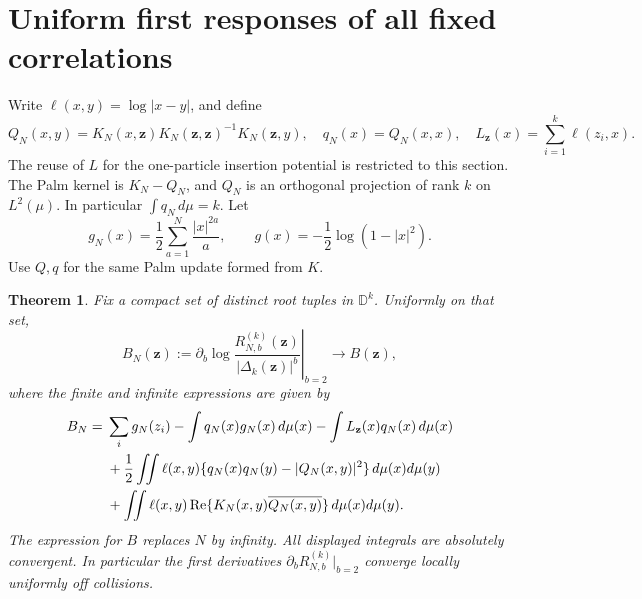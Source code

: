 \documentclass[11pt]{article}
\newtheorem{theorem}{Theorem}[section]
\theoremstyle{remark}\newtheorem{remark}[theorem]{Remark}
\newcommand{\D}{\mathbb D}
\newcommand{\Rea}{\operatorname{Re}}
\begin{document}
\section{Uniform first responses of all fixed correlations}
Write $\ell(x,y)=\log|x-y|$, and define
\[
 Q_N(x,y)=K_N(x,\mathbf z)K_N(\mathbf z,\mathbf z)^{-1}K_N(\mathbf z,y),
 \quad q_N(x)=Q_N(x,x),\quad
 L_{\mathbf z}(x)=\sum_{i=1}^k\ell(z_i,x).
\]
The reuse of $L$ for the one-particle insertion potential is restricted to
this section. The Palm kernel is $K_N-Q_N$, and $Q_N$ is an orthogonal
projection of rank $k$ on $L^2(\mu)$. In particular $\int q_N\,d\mu=k$.
Let
\[
 g_N(x)=\frac12\sum_{a=1}^N\frac{|x|^{2a}}a,
 \qquad g(x)=-\frac12\log(1-|x|^2).
\]
Use $Q,q$ for the same Palm update formed from $K$.

\begin{theorem}\label{first}
Fix a compact set of distinct root tuples in $\D^k$. Uniformly on that set,
\[
 B_N(\mathbf z):=
 \left.\partial_b\log\frac{R_{N,b}^{(k)}(\mathbf z)}
 {|\Delta_k(\mathbf z)|^b}\right|_{b=2}
 \longrightarrow B(\mathbf z),
\]
where the finite and infinite expressions are given by
\begin{align}\label{Bformula}
 B_N={}&\sum_i g_N(z_i)-\int q_N(x)g_N(x)\,d\mu(x)
          -\int L_{\mathbf z}(x)q_N(x)\,d\mu(x)\notag\\
 &+\frac12\iint\ell(x,y)
       \{q_N(x)q_N(y)-|Q_N(x,y)|^2\}\,d\mu(x)d\mu(y)\notag\\
 &+\iint\ell(x,y)\Rea\{K_N(x,y)\overline{Q_N(x,y)}\}
       \,d\mu(x)d\mu(y).
\end{align}
The expression for $B$ replaces $N$ by infinity. All displayed integrals
are absolutely convergent. In particular the first derivatives
$\partial_b R_{N,b}^{(k)}|_{b=2}$ converge locally uniformly off collisions.
\end{theorem}
\end{document}
